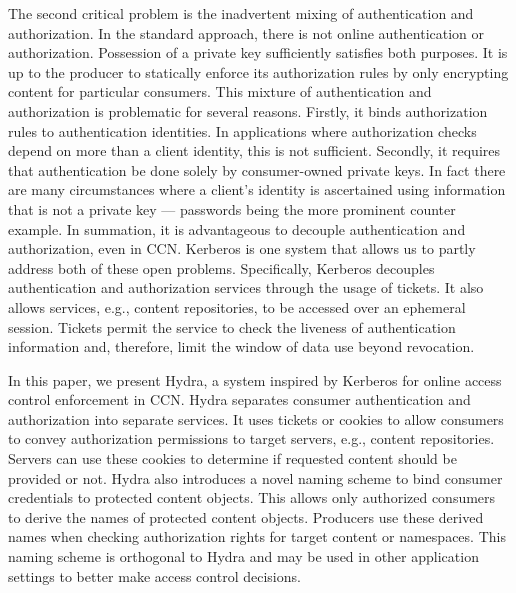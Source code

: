 The second critical problem is the inadvertent mixing of authentication and authorization.
In the standard approach, there is not online authentication or authorization. Possession
of a private key sufficiently satisfies both purposes. It is up to the producer to
statically enforce its authorization rules by only encrypting content for particular
consumers. This mixture of authentication and authorization is problematic for several
reasons. Firstly, it binds authorization rules to authentication identities. In
applications where authorization checks depend on more than a client identity, this is
not sufficient. Secondly, it requires that authentication be done solely by consumer-owned
private keys. In fact there are many circumstances where a client’s identity is ascertained
using information that is not a private key — passwords being the more prominent counter
example. In summation, it is advantageous to decouple authentication and authorization,
even in CCN. Kerberos is one system that allows us to partly address both of these open
problems. Specifically, Kerberos decouples authentication and authorization services
through the usage of tickets. It also allows services, e.g., content repositories, to
be accessed over an ephemeral session. Tickets permit the service to check the liveness
of authentication information and, therefore, limit the window of data use beyond revocation.

In this paper, we present Hydra, a system inspired by Kerberos for online access control
enforcement in CCN. Hydra separates consumer authentication and authorization into
separate services. It uses tickets or cookies to allow consumers to convey authorization
permissions to target servers, e.g., content repositories. Servers can use these cookies
to determine if requested content should be provided or not. Hydra also introduces a
novel naming scheme to bind consumer credentials to protected content objects. This
allows only authorized consumers to derive the names of protected content objects.
Producers use these derived names when checking authorization rights for target content
or namespaces. This naming scheme is orthogonal to Hydra and may be used in other
application settings to better make access control decisions.
